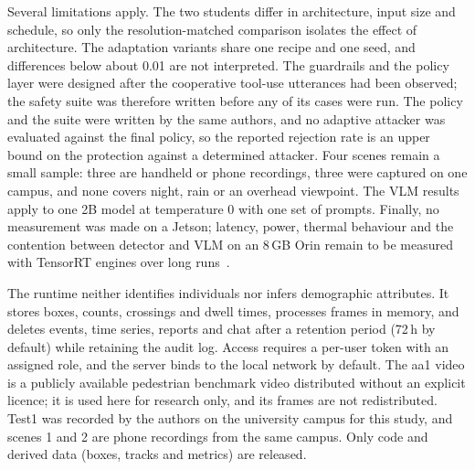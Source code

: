 Several limitations apply. The two students differ in architecture, input size and schedule, so only the
resolution-matched comparison isolates the effect of architecture. The adaptation variants share one recipe and one
seed, and differences below about 0.01 \AP{} are not interpreted. The guardrails and the policy layer were designed
after the cooperative tool-use utterances had been observed; the safety suite was therefore written before any of its
cases were run. The policy and the suite were written by the same authors, and no adaptive attacker was evaluated
against the final policy, so the reported rejection rate is an upper bound on the protection against a determined
attacker. Four scenes remain a small sample: three are handheld or phone recordings, three were captured on
one campus, and none covers night, rain or an overhead viewpoint. The VLM results apply to one 2B model at temperature 0 with one set of
prompts. Finally, no measurement was made on a Jetson; latency, power, thermal behaviour and the contention between
detector and VLM on an 8\,GB Orin remain to be measured with TensorRT engines over long runs~\cite{reddi2020mlperf}.

The runtime neither identifies individuals nor infers demographic attributes. It stores boxes, counts, crossings and
dwell times, processes frames in memory, and deletes events, time series, reports and chat after a retention period
(72\,h by default) while retaining the audit log. Access requires a per-user token with an assigned role, and the
server binds to the local network by default. The aa1 video is a publicly available pedestrian benchmark video
distributed without an explicit licence; it is used here for research only, and its frames are not redistributed.
Test1 was recorded by the authors on the university campus for this study, and scenes 1 and 2 are phone
recordings from the same campus.
Only code and derived data (boxes, tracks and metrics) are released.
